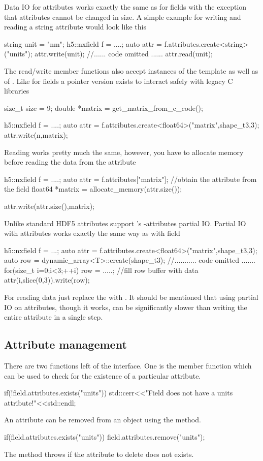 Data IO for attributes works exactly the same as for fields with the exception
that attributes cannot be changed in size. 
A simple example for writing and reading a string attribute would look like this
\begin{cppcode}
string unit = "nm";
h5::nxfield f = ....;
auto attr = f.attributes.create<string>("units");
attr.write(unit);
//...... code omitted ......
attr.read(unit);
\end{cppcode}
The read/write member functions also accept instances of the 
template as well as of . Like for fields a pointer version exists 
to interact safely with legacy C libraries
\begin{cppcode}
size_t size = 9;
double *matrix = get_matrix_from_c_code();

h5::nxfield f = ....;
auto attr = f.attributes.create<float64>("matrix",shape_t{3,3});
attr.write(n,matrix);
\end{cppcode}
Reading works pretty much the same, however, you have to allocate memory before
reading the data from the attribute
\begin{cppcode}
h5::nxfield f = ....;
auto attr = f.attributes["matrix"]; //obtain the attribute from the field
float64 *matrix = allocate_memory(attr.size());

attr.write(attr.size(),matrix);
\end{cppcode}
Unlike standard HDF5 attributes support \libpniio's \nexus-attributes partial
IO. Partial IO with attributes works exactly the same way as with field
\begin{cppcode}
h5::nxfield f = ...;
auto attr = f.attributes.create<float64>("matrix",shape_t{3,3});
auto row  = dynamic_array<T>::create(shape_t{3});
//........... code omitted .......
for(size_t i=0;i<3;++i)
{
    row = .....; //fill row buffer with data
    attr(i,slice(0,3)).write(row);
}
\end{cppcode}
For reading data just replace the  with . It should be
mentioned that using partial IO on attributes, though it works, can be
significantly slower than writing the entire attribute in a single step. 


\subsection{Attribute management}

There are two functions left of the  interface. 
One is the  member function which can be used to check for the
existence of a particular attribute. 
\begin{cppcode}
if(!field.attributes.exists("units"))
    std::cerr<<"Field does not have a units attribute!"<<std::endl;
\end{cppcode}
An attribute can be removed from an object using the  method. 
\begin{cppcode}
if(field.attributes.exists("units"))
    field.attributes.remove("units");
\end{cppcode}
The  method throws  if the attribute to delete does
not exists.

